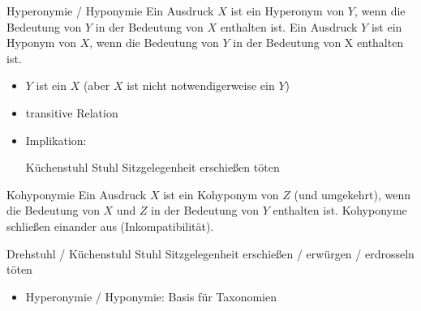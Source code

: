 
\begin{frame}

\begin{block}{Hyperonymie / Hyponymie}
Ein Ausdruck $X$ ist ein Hyperonym von $Y$, wenn die Bedeutung von $Y$ in der Bedeutung von $X$ enthalten ist. Ein Ausdruck $Y$ ist ein Hyponym von $X$, wenn die Bedeutung von $Y$ in der Bedeutung von X enthalten ist.
\end{block}

\begin{itemize}
	\item $Y$ ist ein $X$ (aber $X$ ist nicht notwendigerweise ein $Y$)		
	\item transitive Relation
	\item Implikation: \ras
	
	\eal 
		\ex Küchenstuhl \ras Stuhl \ras Sitzgelegenheit
		\ex erschie\ss{}en \ras töten
	\zl
		
\end{itemize}

\end{frame}


\begin{frame}

\begin{block}{Kohyponymie}
Ein Ausdruck $X$ ist ein Kohyponym von $Z$ (und umgekehrt), wenn die Bedeutung von $X$ und $Z$ in der Bedeutung von $Y$ enthalten ist. Kohyponyme schließen einander aus (Inkompatibilität).
\end{block}

\eal
\ex Drehstuhl / Küchenstuhl \ras Stuhl \ras Sitzgelegenheit
\ex erschießen / erwürgen / erdrosseln \ras töten
\zl

\begin{itemize}
	\item Hyperonymie / Hyponymie: Basis für Taxonomien
\end{itemize}

\end{frame}


